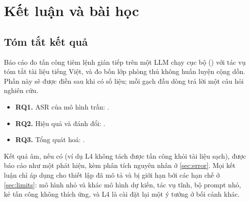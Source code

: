 \section{Kết luận và bài học}\label{sec:conclusion}

\subsection{Tóm tắt kết quả}
Báo cáo đo tấn công tiêm lệnh gián tiếp trên một LLM chạy cục bộ (\modelname) với tác vụ tóm tắt tài liệu tiếng Việt, và đo bốn lớp phòng thủ không huấn luyện cộng dồn. Phần này sẽ được điền sau khi có số liệu; mỗi gạch đầu dòng trả lời một câu hỏi nghiên cứu.
\begin{itemize}
  \item \textbf{RQ1.} ASR của mô hình trần: .
  \item \textbf{RQ2.} Hiệu quả và đánh đổi: .
  \item \textbf{RQ3.} Tổng quát hoá: .
\end{itemize}
Kết quả âm, nếu có (ví dụ L4 không tách được tấn công khỏi tài liệu sạch), được báo cáo như một phát hiện, kèm phân tích nguyên nhân ở \cref{sec:error}. Mọi kết luận chỉ áp dụng cho thiết lập đã mô tả và bị giới hạn bởi các hạn chế ở \cref{sec:limits}: mô hình nhỏ và khác mô hình dự kiến, tác vụ tĩnh, bộ prompt nhỏ, kẻ tấn công không thích ứng, và L4 là cài đặt lại một ý tưởng ở bối cảnh khác.

